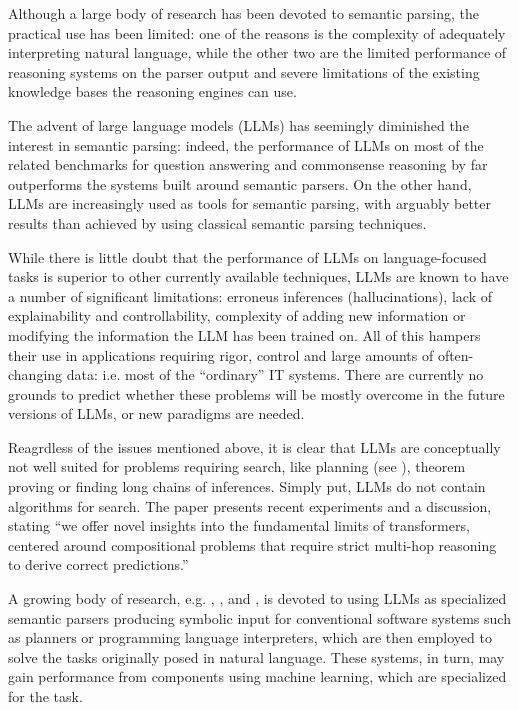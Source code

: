 \documentclass[runningheads]{llncs}
\begin{document}
Although a large body of research has been devoted to semantic parsing, the practical
use has been limited: one of the reasons is the complexity of adequately interpreting
natural language, while the other two are the limited performance of reasoning
systems on the parser output and severe limitations of the existing knowledge bases the
reasoning engines can use.

The advent of large language models (LLMs) has seemingly diminished the interest
in semantic parsing: indeed, the performance of LLMs on most of the related benchmarks
for question answering and commonsense reasoning by far outperforms the systems built
around semantic parsers. On the other hand, LLMs are increasingly used as tools
for semantic parsing, with arguably better results than achieved by using 
classical semantic parsing techniques.

While there is little doubt that the performance of LLMs on language-focused tasks
is superior to other currently available techniques, LLMs are known to have a number of 
significant limitations: erroneus inferences (hallucinations), lack of explainability
and controllability, complexity of adding new information or modifying the information
the LLM has been trained on. All of this hampers their use in applications requiring
rigor, control and large amounts of often-changing data: i.e. most of the
``ordinary'' IT systems. There are currently no grounds to predict whether these
problems will be mostly overcome in the future versions of LLMs, or new paradigms
are needed.

Reagrdless of the issues mentioned above, it is clear that LLMs are conceptually
not well suited for problems requiring search, like planning (see \cite{valmeekam2024planbench}),
theorem proving or finding long chains of inferences. Simply put, LLMs do not contain algorithms
for search. The paper \cite{dziri2024faith} presents recent experiments and a discussion,
stating ``we offer novel insights into the fundamental limits of transformers, centered around compositional
problems that require strict multi-hop reasoning to derive correct predictions.''

A growing body of research, e.g. \cite{trinh2024solving},
\cite{lyu2023faithful}, \cite{olausson2023linc} and \cite{gupta2023building},
is devoted to using LLMs as specialized semantic
parsers producing symbolic input for conventional software systems such
as planners or programming language interpreters, which are then employed
to solve the tasks originally posed in natural language. These systems, in
turn, may gain performance from components using machine learning, which 
are specialized for the task. 
\end{document}

